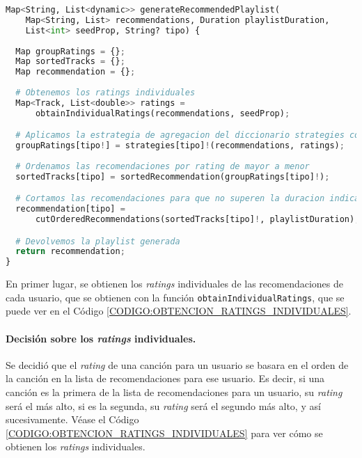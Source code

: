 \begin{lstlisting}[language=python, caption=Proceso de agregación, label=CODIGO:AGREGADOR]
Map<String, List<dynamic>> generateRecommendedPlaylist(
    Map<String, List> recommendations, Duration playlistDuration,
    List<int> seedProp, String? tipo) {
  
  Map groupRatings = {};
  Map sortedTracks = {};
  Map recommendation = {};
  
  # Obtenemos los ratings individuales
  Map<Track, List<double>> ratings =
      obtainIndividualRatings(recommendations, seedProp);

  # Aplicamos la estrategia de agregacion del diccionario strategies correspondiente
  groupRatings[tipo!] = strategies[tipo]!(recommendations, ratings);
  
  # Ordenamos las recomendaciones por rating de mayor a menor
  sortedTracks[tipo] = sortedRecommendation(groupRatings[tipo]!);

  # Cortamos las recomendaciones para que no superen la duracion indicada por el usuario
  recommendation[tipo] =
      cutOrderedRecommendations(sortedTracks[tipo]!, playlistDuration);

  # Devolvemos la playlist generada
  return recommendation;
}

\end{lstlisting}

En primer lugar, se obtienen los \textit{ratings} individuales de las recomendaciones de cada usuario, que se obtienen con la función
 \texttt{obtainIndividualRatings}, que se puede ver en el Código \ref{CODIGO:OBTENCION_RATINGS_INDIVIDUALES}. 

\paragraph{Decisión sobre los \textit{ratings} individuales.}

Se decidió que el \textit{rating} de una canción para un usuario se basara en el orden de la canción en la lista de recomendaciones para ese usuario.
Es decir, si una canción es la primera de la lista de recomendaciones para un usuario, su \textit{rating} será el más alto, si es la segunda, su \textit{rating}
será el segundo más alto, y así sucesivamente. Véase el Código \ref{CODIGO:OBTENCION_RATINGS_INDIVIDUALES} para ver cómo se obtienen los \textit{ratings} individuales.

